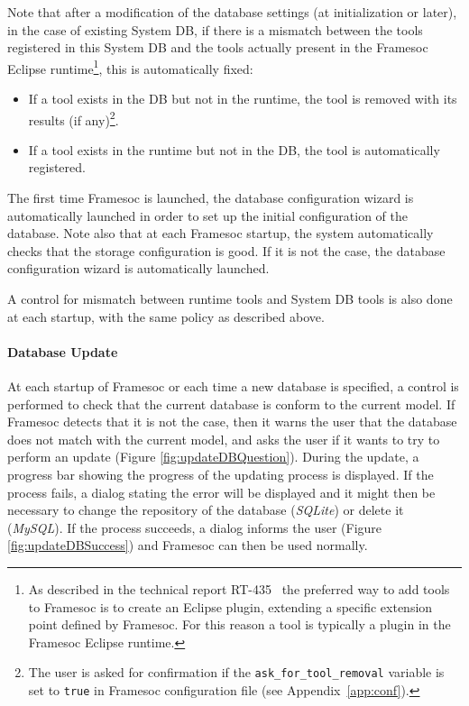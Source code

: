 \documentclass[twoside]{article}
\begin{document}
\begin{sloppypar}
Note that after a modification of the database settings (at initialization or later), in the case of existing System DB, if there is a mismatch between the tools registered in this System DB and the tools actually present in the Framesoc Eclipse runtime\footnote{As described in the technical report RT-435~\cite{pagano:hal-00830008} the preferred way to add tools to Framesoc is to create an Eclipse plugin, extending a specific extension point defined by Framesoc. For this reason a tool is typically a plugin in the Framesoc Eclipse runtime.}, this is automatically fixed:
\begin{itemize}
 \item If a tool exists in the DB but not in the runtime, the tool is removed with its results (if any)\footnote{The user is asked for confirmation if the \texttt{ask\_for\_tool\_removal} variable is set to \texttt{true} in Framesoc configuration file (see Appendix~\ref{app:conf}).}.
 \item If a tool exists in the runtime but not in the DB, the tool is automatically registered.
\end{itemize}

The first time Framesoc is launched, the database configuration wizard is automatically launched in order to set up the initial configuration of the database.
Note also that at each Framesoc startup, the system automatically checks that the storage configuration is good. 
If it is not the case, the database configuration wizard is automatically launched.

A control for mismatch between runtime tools and System DB tools is also done at each startup, with the same policy as described above.

\paragraph{Database Update}
At each startup of Framesoc or each time a new database is specified, a control is performed to check that the current database is conform to the current model. If Framesoc detects that it is not the case, then it warns the user that the database does not match with the current model, and asks the user if it wants to try to perform an update (Figure \ref{fig:updateDBQuestion}). During the update, a progress bar showing the progress of the updating process is displayed. If the process fails, a dialog stating the error will be displayed and it might then be necessary to change the repository of the database (\emph{SQLite}) or delete it (\emph{MySQL}). If the process succeeds, a dialog informs the user (Figure \ref{fig:updateDBSuccess}) and Framesoc can then be used normally.


\end{sloppypar}
\end{document}
